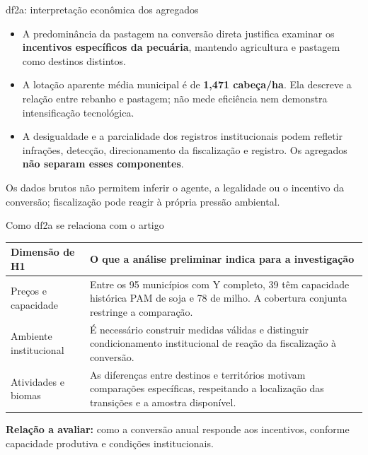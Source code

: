 \documentclass[aspectratio=169,11pt]{beamer}
\newcommand{\fonte}[1]{\par\vfill{\fontsize{7.5}{9}\selectfont\color{gray}#1\par}}
\begin{document}
\begin{frame}{df2a: interpretação econômica dos agregados}
\begin{itemize}
\setlength{\itemsep}{4mm}
\item A predominância da pastagem na conversão direta justifica examinar os \textbf{incentivos específicos da pecuária}, mantendo agricultura e pastagem como destinos distintos.
\item A lotação aparente média municipal é de \textbf{1,471 cabeça/ha}. Ela descreve a relação entre rebanho e pastagem; não mede eficiência nem demonstra intensificação tecnológica.
\item A desigualdade e a parcialidade dos registros institucionais podem refletir infrações, detecção, direcionamento da fiscalização e registro. Os agregados \textbf{não separam esses componentes}.
\end{itemize}
\fonte{Os dados brutos não permitem inferir o agente, a legalidade ou o incentivo da conversão; fiscalização pode reagir à própria pressão ambiental.}
\end{frame}

\begin{frame}{Como df2a se relaciona com o artigo}
\small
\begin{tabularx}{\textwidth}{P{3.35cm} L}
\toprule
\textbf{Dimensão de H1} & \textbf{O que a análise preliminar indica para a investigação}\\
\midrule
Preços e capacidade & Entre os 95 municípios com Y completo, 39 têm capacidade histórica PAM de soja e 78 de milho. A cobertura conjunta restringe a comparação.\\[2mm]
Ambiente institucional & É necessário construir medidas válidas e distinguir condicionamento institucional de reação da fiscalização à conversão.\\[2mm]
Atividades e biomas & As diferenças entre destinos e territórios motivam comparações específicas, respeitando a localização das transições e a amostra disponível.\\
\bottomrule
\end{tabularx}\par
\medskip
\normalsize\textbf{Relação a avaliar:} como a conversão anual responde aos incentivos, conforme capacidade produtiva e condições institucionais.
\end{frame}
\end{document}
